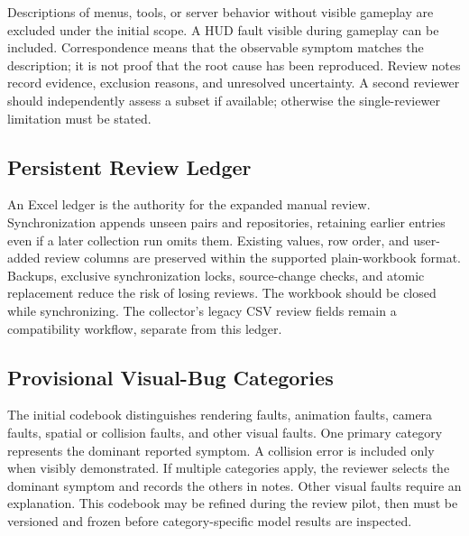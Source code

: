 \documentclass[journal,a4paper,onecolumn]{IEEEtran}
\begin{document}
Descriptions of menus, tools, or server behavior without visible gameplay are excluded under the initial scope. A HUD fault visible during gameplay can be included. Correspondence means that the observable symptom matches the description; it is not proof that the root cause has been reproduced. Review notes record evidence, exclusion reasons, and unresolved uncertainty. A second reviewer should independently assess a subset if available; otherwise the single-reviewer limitation must be stated.

\subsection{Persistent Review Ledger}
An Excel ledger is the authority for the expanded manual review. Synchronization appends unseen pairs and repositories, retaining earlier entries even if a later collection run omits them. Existing values, row order, and user-added review columns are preserved within the supported plain-workbook format. Backups, exclusive synchronization locks, source-change checks, and atomic replacement reduce the risk of losing reviews. The workbook should be closed while synchronizing. The collector's legacy CSV review fields remain a compatibility workflow, separate from this ledger.

\subsection{Provisional Visual-Bug Categories}
The initial codebook distinguishes rendering faults, animation faults, camera faults, spatial or collision faults, and other visual faults. One primary category represents the dominant reported symptom. A collision error is included only when visibly demonstrated. If multiple categories apply, the reviewer selects the dominant symptom and records the others in notes. Other visual faults require an explanation. This codebook may be refined during the review pilot, then must be versioned and frozen before category-specific model results are inspected.
\end{document}
